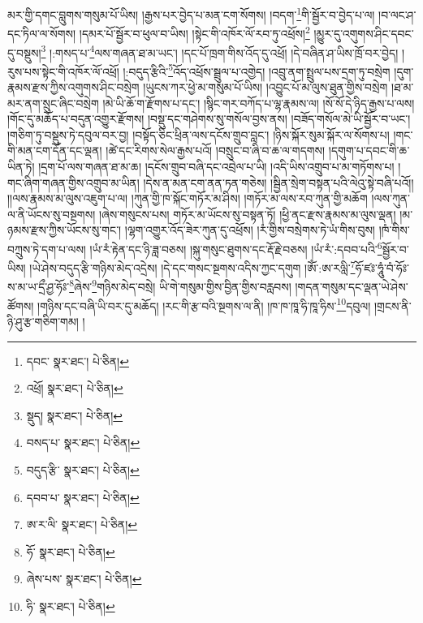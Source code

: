 མར་གྱི་དགང་བླུགས་གསུམ་པོ་ཡིས། །རྒྱས་པར་བྱེད་པ་མན་ངག་སོགས། །བདག་\footnote{དབང་  སྣར་ཐང་།  པེ་ཅིན། }གི་སྦྱོར་བ་བྱེད་པ་ལ། །བ་ལང་ཤ་དང་ཏིལ་ལ་སོགས། །དམར་པོ་སྦྱོར་བ་ཕུལ་བ་ཡིས། །སྟེང་གི་འཁོར་ལོ་རབ་ཏུ་འཕྲོས།\footnote{འཕྲོ།  སྣར་ཐང་།  པེ་ཅིན། } །མྱུར་དུ་འགུགས་ཤིང་དབང་དུ་བསྡུས།\footnote{སྡུད།  སྣར་ཐང་།  པེ་ཅིན། } །:གསད་པ་\footnote{བསད་པ་  སྣར་ཐང་།  པེ་ཅིན། }ལས་གཞན་ཐ་མ་ཡང་། །དང་པོ་ཁྲག་གིས་འོད་དུ་འཕྲོ། །དེ་བཞིན་ཤ་ཡིས་ཁྲོ་བར་བྱེད། །རུས་པས་སྟེང་གི་འཁོར་ལོ་འཕྲོ། །:བདུད་རྩིའི་\footnote{བདུད་རྩི་  སྣར་ཐང་།  པེ་ཅིན། }འོད་འཕྲོས་སྦྲུལ་པ་འགྱེད། །འབྲུ་ནག་སྤྲུལ་པས་དྲག་ཏུ་བསྲེག །དུག་རྣམས་རྫས་ཀྱིས་འགུགས་ཤིང་བསྲེག །ཡུངས་ཀར་ཕྱེ་མ་གསུམ་པོ་ཡིས། །འབྱུང་པོ་མ་ལུས་ཐུན་གྱིས་བསྲེག །ཐ་མ་མར་ནག་སྲུང་ཞིང་བསྲེག །མེ་ཡི་ཆོ་ག་རྫོགས་པ་དང་། །སྙིང་གར་བཀོད་པ་ལྷ་རྣམས་ལ། །སོ་སོ་དེ་ཉིད་རྒྱས་པ་ལས། །གོང་དུ་མཆོད་པ་བདུན་འགྱུར་རྫོགས། །བསྡུ་དང་གཤེགས་སུ་གསོལ་བྱས་ནས། །བཟོད་གསོལ་མེ་ཡི་སྦྱོར་བ་ཡང་། །གཅིག་ཏུ་བསྡུས་ཏེ་དབུལ་བར་བྱ། །བསྟོད་ཅིང་ཕྲིན་ལས་དངོས་གྲུབ་བླང་། །ཉིས་སྐོར་སུམ་སྐོར་ལ་སོགས་པ། །གང་གི་མན་ངག་དོན་དང་ལྡན། །ཚེ་དང་རིགས་སེལ་རྒྱས་པའོ། །བསྲུང་བ་ཞི་བ་ཆ་ལ་གདགས། །དགུག་པ་དབང་གི་ཆ་ཡིན་ཏེ། །དྲག་པོ་ལས་གཞན་ཐ་མ་ཆ། །དངོས་གྲུབ་བཞི་དང་འབྲེལ་པ་ཡི། །འདི་ཡིས་འགྲུབ་པ་མ་གཏོགས་པ། །གང་ཞིག་གཞན་གྱིས་འགྲུབ་མ་ཡིན། །དེས་ན་མན་ངག་ནན་ཏན་གཅེས། །སྦྱིན་སྲེག་བསྟན་པའི་ལེའུ་སྟེ་བཞི་པའོ།། །།ལས་རྣམས་མ་ལུས་འཇུག་པ་ལ། །ཀུན་གྱི་ཁ་སྐོང་གཏོར་མ་ཤིས། །གཏོར་མ་ལས་རབ་ཀུན་གྱི་མཆོག །ལས་ཀུན་ལ་ནི་ཡོངས་སུ་བསྔགས། །ཞེས་གསུངས་པས། གཏོར་མ་ཡོངས་སུ་བསྟན་ཏོ། །ཕྱི་ནང་རྫས་རྣམས་མ་ལུས་ལྡན། །མ་ཉམས་རྫས་ཀྱིས་ཡོངས་སུ་གང་། །ལྷག་འགྱུར་འོད་ཟེར་ཀུན་དུ་འཕྲོས། །རཾ་གྱིས་བསྲེགས་ཏེ་ཡཾ་གིས་བུས། །ཁཾ་གིས་བཀྲུས་ཏེ་དག་པ་ལས། །ཡཾ་རཾ་རྟེན་དང་ཉི་ཟླ་བཅས། །སྐུ་གསུང་ཐུགས་དང་རྡོ་རྗེ་བཅས། །ཡཾ་རཾ་:དབབ་པའི་\footnote{དབབ་པ་  སྣར་ཐང་།  པེ་ཅིན། }སྦྱོར་བ་ཡིས། །ཡེ་ཤེས་བདུད་རྩི་གཉིས་མེད་འདྲེས། །དེ་དང་གསང་སྔགས་འདིས་ཀྱང་དགུག །ཨོཾ་:ཨ་རལླི་\footnote{ཨ་ར་ལི་  སྣར་ཐང་།  པེ་ཅིན། }ཧོ་ཛཿ་ཧཱུཾ་བཾ་ཧོཿ་ས་མ་ཡ་དྲྀ་ཤྱ་ཧོཿ་\footnote{ཧོ་  སྣར་ཐང་།  པེ་ཅིན། }ཞེས་\footnote{ཞེས་པས་  སྣར་ཐང་།  པེ་ཅིན། }གཉིས་མེད་བསྲེ། ཡི་གེ་གསུམ་གྱིས་བྱིན་གྱིས་བརླབས། །གདན་གསུམ་དང་ལྡན་ཡེ་ཤེས་ཚོགས། །གཉིས་དང་བཞི་ཡི་བར་དུ་མཆོད། །རང་གི་རྩ་བའི་སྔགས་ལ་ནི། །ཁ་ཁ་ཁཱ་ཧི་ཁཱ་ཧིས་\footnote{ཧི་  སྣར་ཐང་།  པེ་ཅིན། }དབུལ། །གྲངས་ནི་ཉི་ཤུ་རྩ་གཅིག་གམ། །
